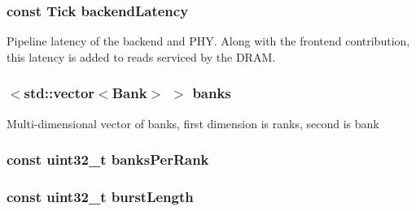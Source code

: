 \label{classDRAMCtrl_a4cdec63bcb455cfe5f1d8e6db40b66f5}
\hypertarget{classDRAMCtrl_af7b0d4000762b26f57e6bdbbdf45cf6d}{
\subsubsection[{backendLatency}]{\setlength{\rightskip}{0pt plus 5cm}const {\bf Tick} {\bf backendLatency}}}
\label{classDRAMCtrl_af7b0d4000762b26f57e6bdbbdf45cf6d}
Pipeline latency of the backend and PHY. Along with the frontend contribution, this latency is added to reads serviced by the DRAM. \hypertarget{classDRAMCtrl_ac4dd7a78e52bcaca6fb18d24b45bb7f3}{
\subsubsection[{banks}]{$<${\bf std::vector}$<${\bf Bank}$>$ $>$ {\bf banks}}}
\label{classDRAMCtrl_ac4dd7a78e52bcaca6fb18d24b45bb7f3}
Multi-\/dimensional vector of banks, first dimension is ranks, second is bank \hypertarget{classDRAMCtrl_abd3ef09f9d5c70e15763a9761c8a14ca}{
\subsubsection[{banksPerRank}]{\setlength{\rightskip}{0pt plus 5cm}const {\bf uint32\_\-t} {\bf banksPerRank}}}
\label{classDRAMCtrl_abd3ef09f9d5c70e15763a9761c8a14ca}
\hypertarget{classDRAMCtrl_a7ac4e4b031082616f09700ea29168920}{
\subsubsection[{burstLength}]{\setlength{\rightskip}{0pt plus 5cm}const {\bf uint32\_\-t} {\bf burstLength}}}
\label{classDRAMCtrl_a7ac4e4b031082616f09700ea29168920}
